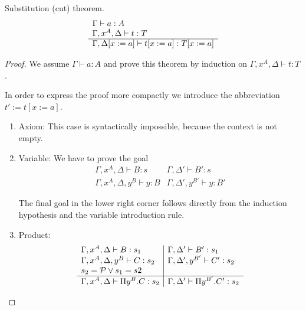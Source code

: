 \begin{theorem}
    \label{SubstitutionLemma}
    Substitution (cut) theorem.
    $$
    \begin{array}{l} 
        \Gamma \vdash a: A
        \\
        \Gamma, x^A, \Delta \vdash t: T
     \\ \hline 
        \Gamma, \Delta[x:=a] \vdash t[x:=a]: T[x:=a]
    \end{array}
    $$

    \begin{proof}
        We assume
        $\Gamma \vdash a: A$
        and prove this theorem by induction on
        $\Gamma, x^A, \Delta \vdash t: T$.

        In order to express the proof more compactly we introduce the
        abbreviation $t' := t[x:=a]$.

        \begin{enumerate}
            \item Axiom: This case is syntactically impossible, because the
                context is not empty.

            \item Variable: We have to prove the goal
                $$
                \begin{array}{l|l}
                    \Gamma, x^A, \Delta \vdash B: s
                    &
                    \Gamma, \Delta' \vdash B': s
                    \\
                    \hline
                    \Gamma, x^A, \Delta, y^B \vdash y: B
                    &
                    \Gamma, \Delta', y^{B'} \vdash y: B'
                \end{array}
                $$

                The final goal in the lower right corner follows directly from
                the induction hypothesis and the variable introduction rule.

            \item Product:
                $$
                \begin{array}{l|l}
                    \Gamma, x^A, \Delta \vdash B: s_1
                    &
                    \Gamma, \Delta' \vdash B': s_1
                    \\
                    \Gamma, x^A, \Delta, y^B \vdash C: s_2
                    &
                    \Gamma, \Delta', y^{B'} \vdash C': s_2
                    \\
                    s_2 = {\cal P} \lor s_1 = s2
                    \\
                    \hline
                    \Gamma, x^A, \Delta \vdash \Pi y^B. C : s_2
                    &
                    \Gamma, \Delta' \vdash \Pi y^{B'}. C': s_2
                \end{array}
                $$


\end{enumerate}
\end{proof}
\end{theorem}
